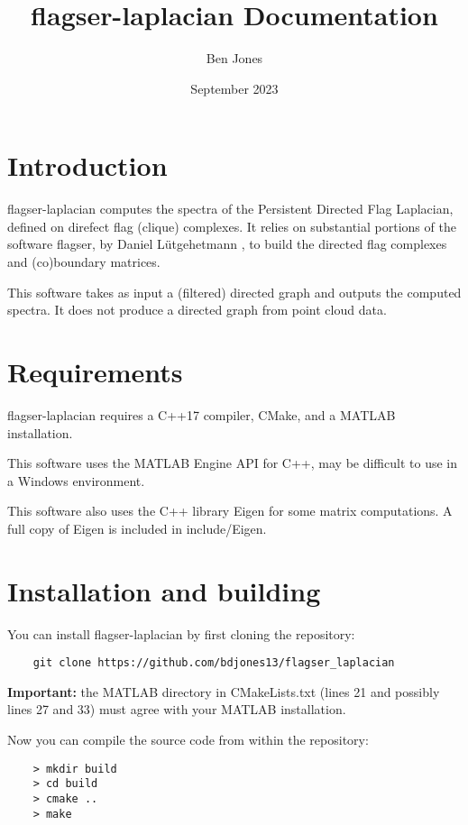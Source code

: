 \documentclass{article}
\title{flagser-laplacian Documentation}
\author{Ben Jones}
\date{September 2023}
\begin{document}
\maketitle

\section{Introduction}
flagser-laplacian computes the spectra of the Persistent Directed Flag Laplacian, defined on direfect flag (clique) complexes. It relies on substantial portions of the software flagser, by Daniel L\"utgehetmann \cite{lutgehetmannComputingPersistentHomology2020}, to build the directed flag complexes and (co)boundary matrices. 

This software takes as input a (filtered) directed graph and outputs the computed spectra. It does not produce a directed graph from point cloud data.

\section{Requirements}
flagser-laplacian requires a C++17 compiler, CMake, and a MATLAB installation.

This software uses the MATLAB Engine API for C++, may be difficult to use in a Windows environment.

This software also uses the C++ library Eigen for some matrix computations. A full copy of Eigen is included in include/Eigen. 

\section{Installation and building}
You can install flagser-laplacian by first cloning the repository:

\begin{verbatim}
    git clone https://github.com/bdjones13/flagser_laplacian
\end{verbatim} 

\vspace{1em}
\textbf{Important:} the MATLAB directory in CMakeLists.txt (lines 21 and possibly lines 27 and 33) must agree with your MATLAB installation.
\vspace{1em}

Now you can compile the source code from within the repository: 

\begin{verbatim}
    > mkdir build
    > cd build
    > cmake ..
    > make
\end{verbatim}
\end{document}
